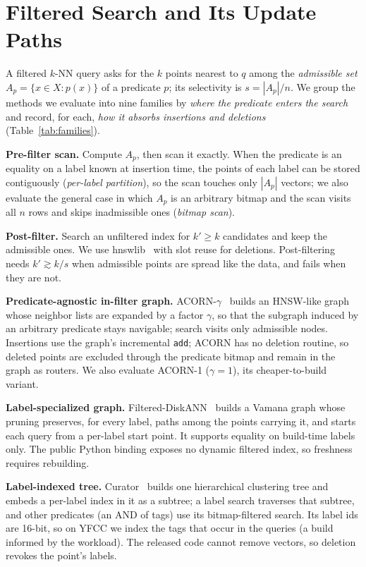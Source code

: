 \documentclass[conference]{IEEEtran}
\begin{document}
\section{Filtered Search and Its Update Paths}\label{sec:families}
A filtered $k$-NN query asks for the $k$ points nearest to $q$ among the \emph{admissible set} $A_p=\{x\in X: p(x)\}$ of a predicate $p$; its selectivity is $s=|A_p|/n$. We group the methods we evaluate into nine families by \emph{where the predicate enters the search} and record, for each, \emph{how it absorbs insertions and deletions} (Table~\ref{tab:families}).

\textbf{Pre-filter scan.} Compute $A_p$, then scan it exactly. When the predicate is an equality on a label known at insertion time, the points of each label can be stored contiguously (\emph{per-label partition}), so the scan touches only $|A_p|$ vectors; we also evaluate the general case in which $A_p$ is an arbitrary bitmap and the scan visits all $n$ rows and skips inadmissible ones (\emph{bitmap scan}).

\textbf{Post-filter.} Search an unfiltered index for $k'\ge k$ candidates and keep the admissible ones. We use hnswlib~\cite{hnsw} with slot reuse for deletions. Post-filtering needs $k'\gtrsim k/s$ when admissible points are spread like the data, and fails when they are not.

\textbf{Predicate-agnostic in-filter graph.} ACORN-$\gamma$~\cite{acorn} builds an HNSW-like graph whose neighbor lists are expanded by a factor $\gamma$, so that the subgraph induced by an arbitrary predicate stays navigable; search visits only admissible nodes. Insertions use the graph's incremental \texttt{add}; ACORN has no deletion routine, so deleted points are excluded through the predicate bitmap and remain in the graph as routers. We also evaluate ACORN-1 ($\gamma{=}1$), its cheaper-to-build variant.

\textbf{Label-specialized graph.} Filtered-DiskANN~\cite{filtereddiskann} builds a Vamana graph whose pruning preserves, for every label, paths among the points carrying it, and starts each query from a per-label start point. It supports equality on build-time labels only. The public Python binding exposes no dynamic filtered index, so freshness requires rebuilding.

\textbf{Label-indexed tree.} Curator~\cite{curator} builds one hierarchical clustering tree and embeds a per-label index in it as a subtree; a label search traverses that subtree, and other predicates (an AND of tags) use its bitmap-filtered search. Its label ids are 16-bit, so on YFCC we index the tags that occur in the queries (a build informed by the workload). The released code cannot remove vectors, so deletion revokes the point's labels.
\end{document}
